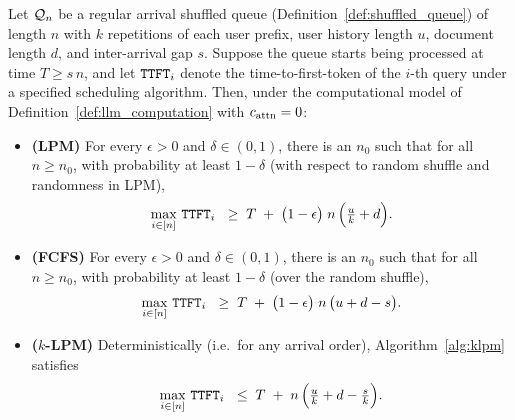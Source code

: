 \begin{theorem}
\label{thm:klpm_separation}
Let $\mathcal{Q}_n$ be a regular arrival shuffled queue (Definition~\ref{def:shuffled_queue}) of length $n$ with $k$ repetitions of each user prefix, user history length $u$, document length $d$, and inter-arrival gap $s$.  Suppose the queue starts being processed at time $T \ge s\,n$, and let $\texttt{TTFT}_i$ denote the time-to-first-token of the $i$-th query under a specified scheduling algorithm. Then, under the computational model of Definition~\ref{def:llm_computation} with $c_{\mathrm{attn}} = 0$:

\begin{itemize}
\item
\textbf{(LPM)} 
For every $\epsilon>0$ and $\delta \in (0,1)$, there is an $n_0$ such that for all $n \ge n_0$, with probability at least $1-\delta$ (with respect to random shuffle and randomness in LPM),
\[
\max_{i\in [n]}\,\texttt{TTFT}_i
~\;\ge\;
T \;+\;
\bigl(1 - \epsilon\bigr)\;n\,\Bigl(\tfrac{u}{k} + d\Bigr).
\]

\item
\textbf{(FCFS)}
For every $\epsilon>0$ and $\delta \in (0,1)$, there is an $n_0$ such that for all $n \ge n_0$, with probability at least $1-\delta$ (over the random shuffle),
\[
\max_{i\in [n]}\,\texttt{TTFT}_i
~\;\ge\;
T \;+\;
\bigl(1 - \epsilon\bigr)\;n\,\bigl(u + d - s\bigr).
\]

\item
\textbf{($k$-LPM)} 
Deterministically (i.e.\ for any arrival order), Algorithm~\ref{alg:klpm} satisfies
\[
\max_{i\in [n]}\,\texttt{TTFT}_i 
~\;\le\;
T \;+\;
n\,\Bigl(\tfrac{u}{k} + d - \tfrac{s}{k}\Bigr).
\]
\end{itemize}
\end{theorem}

